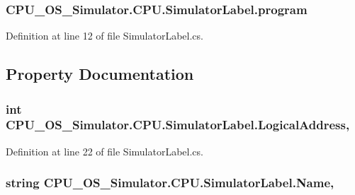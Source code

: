 \subsubsection[{program}]{ C\+P\+U\+\_\+\+O\+S\+\_\+\+Simulator.\+C\+P\+U.\+Simulator\+Label.\+program\hspace{0.3cm}{\ttfamily [private]}}\label{class_c_p_u___o_s___simulator_1_1_c_p_u_1_1_simulator_label_a36f257dae0ef3fbe2f065d512bb77ea6}


Definition at line 12 of file Simulator\+Label.\+cs.



\subsection{Property Documentation}
\hypertarget{class_c_p_u___o_s___simulator_1_1_c_p_u_1_1_simulator_label_a24d8cf4f09a3b9cb84f279d300a87e73}{}
\subsubsection[{Logical\+Address}]{\setlength{\rightskip}{0pt plus 5cm}int C\+P\+U\+\_\+\+O\+S\+\_\+\+Simulator.\+C\+P\+U.\+Simulator\+Label.\+Logical\+Address\hspace{0.3cm}{\ttfamily [get]}, {\ttfamily [set]}}\label{class_c_p_u___o_s___simulator_1_1_c_p_u_1_1_simulator_label_a24d8cf4f09a3b9cb84f279d300a87e73}


Definition at line 22 of file Simulator\+Label.\+cs.

\hypertarget{class_c_p_u___o_s___simulator_1_1_c_p_u_1_1_simulator_label_ad972ea456b90d8e8ec4e550e28f418a6}{}
\subsubsection[{Name}]{\setlength{\rightskip}{0pt plus 5cm}string C\+P\+U\+\_\+\+O\+S\+\_\+\+Simulator.\+C\+P\+U.\+Simulator\+Label.\+Name\hspace{0.3cm}{\ttfamily [get]}, {\ttfamily [set]}}\label{class_c_p_u___o_s___simulator_1_1_c_p_u_1_1_simulator_label_ad972ea456b90d8e8ec4e550e28f418a6}


